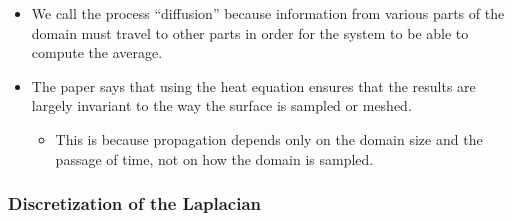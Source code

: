 \documentclass[10pt]{article}
\begin{document}
\begin{itemize}
    \item We call the process ``diffusion'' because information from various parts of the domain must travel to other parts in order for the system to be able to compute the average.
    
    \item The paper says that using the heat equation ensures that the results are largely invariant to the way the surface is sampled or meshed.
    \begin{itemize}
        \item This is because propagation depends only on the domain size and the passage of time, not on how the domain is sampled.
    \end{itemize}
\end{itemize}

\subsubsection{Discretization of the Laplacian}
\end{document}
